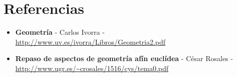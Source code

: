 \documentclass[11pt]{article}
\theoremstyle{definition}
\begin{document}
\section{Referencias}

\begin{itemize}
\item\textbf{Geometría} - Carlos Ivorra - \url{http://www.uv.es/ivorra/Libros/Geometria2.pdf}
\item\textbf{Repaso de aspectos de geometría afín euclídea} - César Rosales - \url{http://www.ugr.es/~crosales/1516/cys/tema0.pdf}
\end{itemize}
\end{document}
